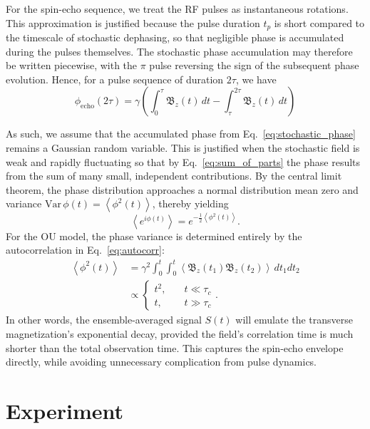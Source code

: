\documentclass[%
 reprint,
 amsmath,amssymb,
 aps,
]{revtex4-2}
\begin{document}
For the spin-echo sequence, we treat the RF pulses as instantaneous rotations. This approximation is justified because the pulse duration $t_p$ is short compared to the timescale of stochastic dephasing, so that negligible phase is accumulated during the pulses themselves. The stochastic phase accumulation may therefore be written piecewise, with the $\pi$ pulse reversing the sign of the subsequent phase evolution. Hence, for a pulse sequence of duration $2\tau$, we have
\begin{equation}
    \phi_{\text{echo}}(2\tau) = \gamma\left(\int_0^{\tau}\mathfrak{B}_z (t)\,dt - \int_\tau^{2\tau}\mathfrak{B}_z(t)\,dt\right)
    \label{eq:echo_phase}
\end{equation}

As such, we assume that the accumulated phase from Eq.~\ref{eq:stochastic_phase} remains a Gaussian random variable. This is justified when the stochastic field is weak and rapidly fluctuating so that by Eq.~\ref{eq:sum_of_parts} the phase results from the sum of many small, independent contributions. By the central limit theorem, the phase distribution approaches a normal distribution mean zero and variance $\mathrm{Var\,}\phi (t) = \left\langle \phi^2 (t)\right\rangle$, thereby yielding
\begin{equation*}
    \left\langle e^{i\phi(t)} \right\rangle = e^{-\frac{1}{2} \left\langle \phi^2 (t)\right\rangle}.
\end{equation*}
For the OU model, the phase variance is determined entirely by the autocorrelation in Eq.~\ref{eq:autocorr}:
\begin{align*}
    \left\langle\phi^2(t)\right\rangle &= \gamma^2 \int_0^t \int_0^t \left\langle \mathfrak{B}_z (t_1) \mathfrak{B}_z (t_2)\right\rangle\,dt_1dt_2\\
    &\propto\begin{cases}
            t^2,&\quad t\ll \tau_c\\
            t,&\quad t\gg\tau_c
        \end{cases}.
\end{align*}
In other words, the ensemble-averaged signal $S(t)$ will emulate the transverse magnetization's exponential decay, provided the field's correlation time is much shorter than the total observation time. This captures the spin-echo envelope directly, while avoiding unnecessary complication from pulse dynamics.

\section{Experiment}
\label{sec:experiment}
\end{document}
